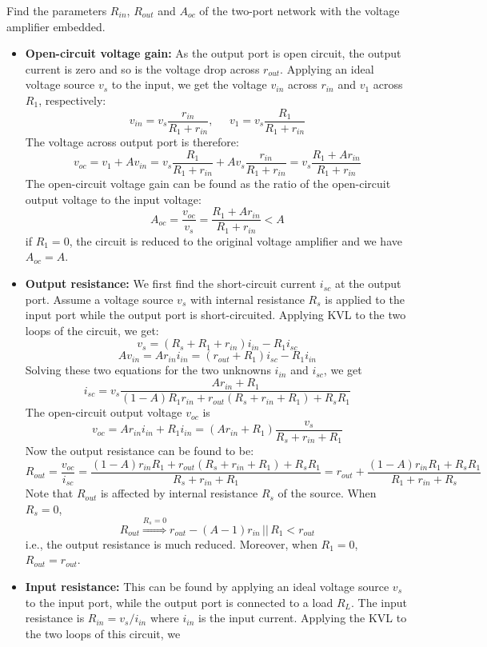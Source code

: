\begin{itemize}
Find the parameters $R_{in}$, $R_{out}$ and $A_{oc}$ of the two-port network
with the voltage amplifier embedded.
\begin{itemize}
\item {\bf Open-circuit voltage gain:} As the output port is open circuit, 
  the output current is zero and so is the voltage drop across $r_{out}$.
  Applying an ideal voltage source $v_s$ to the input, we get the voltage 
  $v_{in}$ across $r_{in}$ and $v_1$ across $R_1$, respectively:
  \[ v_{in}=v_s \frac{r_{in}}{R_1+r_{in}},\;\;\;\;\;
  v_1=v_s \frac{R_1}{R_1+r_{in}} \]
  The voltage across output port is therefore:
  \[ v_{oc}=v_1+A v_{in}=v_s \frac{R_1}{R_1+r_{in}}+Av_s\frac{r_{in}}{R_1+r_{in}}
  =v_s \frac{R_1+A r_{in}}{R_1+r_{in}}  \]
  The open-circuit voltage gain can be found as the ratio of the open-circuit
  output voltage to the input voltage:
  \[ A_{oc}=\frac{v_{oc}}{v_s}=\frac{R_1+A r_{in}}{R_1+r_{in}}<A  \]
  if $R_1=0$, the circuit is reduced to the original voltage amplifier and we
  have $A_{oc}=A$.
\item {\bf Output resistance:} We first find the short-circuit current $i_{sc}$ 
  at the output port. Assume a voltage source $v_s$ with internal resistance 
  $R_s$ is applied to the input port while the output port is short-circuited.
  Applying KVL to the two loops of the circuit, we get:
  \[ v_s=(R_s+R_1+r_{in})i_{in}-R_1 i_{sc} \]
  \[ A v_{in}=A r_{in} i_{in}=(r_{out}+R_1) i_{sc}-R_1 i_{in} \]
  Solving these two equations for the two unknowns $i_{in}$ and $i_{sc}$, we get
  \[ i_{sc}=v_s \frac{Ar_{in}+R_1}{(1-A)R_1 r_{in} +r_{out}(R_s+r_{in}+R_1)
    +R_sR_1} \]
  The open-circuit output voltage $v_{oc}$ is 
  \[ v_{oc}=Ar_{in}i_{in}+R_1i_{in}=(Ar_{in}+R_1)\frac{v_s}{R_s+r_{in}+R_1} \]
  Now the output resistance can be found to be:
  \[ R_{out}=\frac{v_{oc}}{i_{sc}}
  =\frac{(1-A)r_{in}R_1+r_{out}(R_s+r_{in}+R_1)+R_sR_1}{R_s+r_{in}+R_1}
  =r_{out}+\frac{(1-A) r_{in}R_1 +R_sR_1}{R_1+r_{in}+R_s}\]
  Note that $R_{out}$ is affected by internal resistance $R_s$ of the source.
  When $R_s=0$, 
  \[
  R_{out}\stackrel{R_s=0}{\Longrightarrow} r_{out}-(A-1) r_{in}\,||\,R_1 < r_{out} 
  \]
  i.e., the output resistance is much reduced. Moreover, when $R_1=0$, 
  $R_{out}=r_{out}$.
\item {\bf Input resistance:} This can be found by applying an ideal voltage
  source $v_s$ to the input port, while the output port is connected to a 
  load $R_L$. The input resistance is $R_{in}=v_s/i_{in}$ where $i_{in}$ is
  the input current. Applying the KVL to the two loops of this circuit, we

\end{itemize}
\end{itemize}
